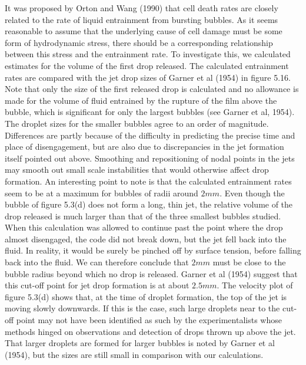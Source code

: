 It was proposed by Orton and Wang (1990) that cell death rates are 
closely related to the rate of liquid entrainment from bursting bubbles.
As it seems reasonable to assume that the underlying cause of cell 
damage must be some form of hydrodynamic stress, there should be a 
corresponding relationship between this stress and the entrainment rate.
To investigate this, we calculated estimates for the 
volume of the first drop released. 
The calculated entrainment rates are 
compared with the jet drop sizes of Garner et al (1954) in figure 5.16.  
Note that only the size of the first released drop is calculated
and no allowance is made for the volume of fluid entrained by the rupture of the
film above the bubble, which is significant for only the largest bubbles
(see Garner et al, 1954).
The droplet sizes for the smaller bubbles agree to an order of magnitude.
Differences are partly because of 
the difficulty in predicting the precise time and place of disengagement,
but are also
due to discrepancies in the jet formation itself pointed out above.
Smoothing and repositioning of nodal points in the jets may smooth out
small scale instabilities that would otherwise affect drop formation.
An interesting point to note is that the calculated entrainment rates seem
to be at a maximum for bubbles of radii around $2mm$. Even though the
bubble of figure 5.3(d) does not form a long, thin jet, the relative volume of the 
drop released is much larger
than that of the three smallest bubbles studied.
When this calculation was allowed to continue past the point where
the drop almost disengaged,
the code did not break down, but the jet fell back into the fluid. 
In reality, it would be surely be pinched off by surface tension, before
falling back into the fluid.
We can therefore conclude that 
$2mm$ must be close to the bubble radius beyond which no drop is released. 
Garner et al (1954) suggest that this
cut-off point for jet drop formation is at about $2.5mm$.  
The velocity plot of figure 5.3(d) shows that, at the time of droplet 
formation, the top of the jet is moving slowly downwards.
If this is the 
case, such large droplets near to the cut-off point
may not have been identified as such by the 
experimentalists whose methods hinged on observations and detection of drops
thrown up above the jet.
That larger droplets are formed for larger bubbles is noted by
Garner et al (1954), but the sizes are still small in comparison with 
our calculations.

